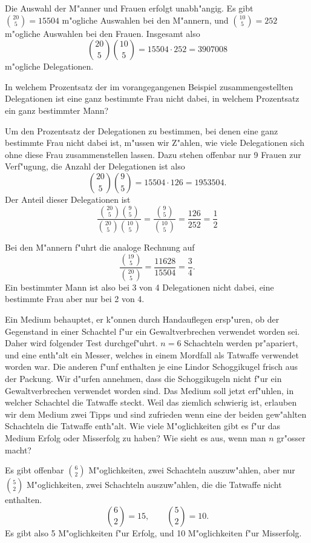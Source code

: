 \begin{beispiele}
\begin{loesung}
Die Auswahl der M"anner und Frauen erfolgt unabh"angig.
Es gibt
$\binom{20}{5}=15504$ m"ogliche Auswahlen bei den M"annern,
und $\binom{10}{5}=252$ m"ogliche Auswahlen bei den Frauen.
Insgesamt also
\[
\binom{20}{5}\binom{10}{5}=15504\cdot 252 = 3907008
\]
m"ogliche Delegationen.
\end{loesung}

\item In welchem Prozentsatz der im vorangegangenen Beispiel
zusammengestellten Delegationen ist eine ganz bestimmte Frau
nicht dabei, in welchem Prozentsatz ein ganz bestimmter Mann?

\begin{loesung}
Um den Prozentsatz der Delegationen zu bestimmen, bei denen
eine ganz bestimmte Frau nicht dabei ist, m"ussen wir Z"ahlen,
wie viele Delegationen sich ohne diese Frau zusammenstellen 
lassen.
Dazu stehen offenbar nur 9 Frauen zur Verf"ugung, die 
Anzahl der Delegationen ist also
\[
\binom{20}{5}\binom{9}{5}=15504\cdot 126 = 1953504.
\]
Der Anteil dieser Delegationen ist
\[
\frac{
\binom{20}{5}\binom{9}{5}
}{
\binom{20}{5}\binom{10}{5}
}
=
\frac{ \binom{9}{5} }{ \binom{10}{5} }
=
\frac{126}{252}=\frac12
\]
\end{loesung}
Bei den M"annern f"uhrt die analoge Rechnung auf
\[
\frac{\binom{19}{5}}{\binom{20}{5}}=\frac{11628}{15504}=\frac34.
\]
Ein bestimmter Mann ist also bei 3 von 4 Delegationen nicht dabei,
eine bestimmte Frau aber nur bei 2 von 4.
\item Ein Medium behauptet, er k"onnen durch Handauflegen ersp"uren, ob
der Gegenstand in einer Schachtel f"ur ein Gewaltverbrechen verwendet
worden sei.
Daher wird folgender Test durchgef"uhrt.
$n=6$
Schachteln werden pr"apariert, und eine enth"alt ein Messer,
welches in einem Mordfall als Tatwaffe verwendet worden war.
Die anderen f"unf enthalten je eine Lindor Schoggikugel frisch aus der Packung.
Wir d"urfen annehmen, dass die Schoggikugeln nicht f"ur ein Gewaltverbrechen
verwendet worden sind.
Das Medium soll jetzt erf"uhlen, in welcher
Schachtel die Tatwaffe steckt.
Weil das ziemlich schwierig ist, erlauben
wir dem Medium zwei Tipps und sind zufrieden wenn eine der beiden
gew"ahlten Schachteln die Tatwaffe enth"alt.
Wie viele M"oglichkeiten gibt
es f"ur das Medium Erfolg oder Misserfolg zu haben?
Wie sieht es aus, wenn man $n$ gr"osser macht?

\begin{loesung}
Es gibt offenbar $\binom{6}{2}$ M"oglichkeiten, zwei Schachteln auszuw"ahlen,
aber nur $\binom{5}{2}$ M"oglichkeiten, zwei Schachteln auszuw"ahlen,
die die Tatwaffe nicht enthalten.
\[
\binom{6}{2}=15,\qquad\binom{5}{2}=10.
\]
Es gibt also 5 M"oglichkeiten f"ur Erfolg, und 10 M"oglichkeiten
f"ur Misserfolg.


\end{loesung}
\end{beispiele}
